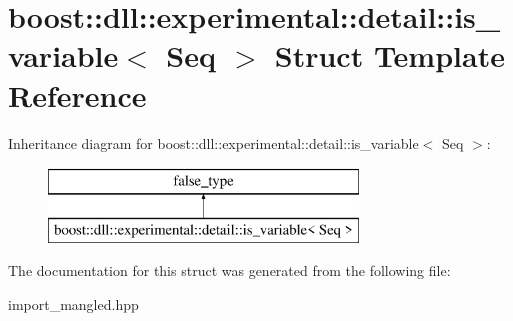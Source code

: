 \hypertarget{a01680}{}\section{boost\+:\+:dll\+:\+:experimental\+:\+:detail\+:\+:is\+\_\+variable$<$ Seq $>$ Struct Template Reference}
\label{a01680}
Inheritance diagram for boost\+:\+:dll\+:\+:experimental\+:\+:detail\+:\+:is\+\_\+variable$<$ Seq $>$\+:\begin{figure}[H]
\begin{center}
\leavevmode
\includegraphics[height=2.000000cm]{a01680}
\end{center}
\end{figure}


The documentation for this struct was generated from the following file\+:\begin{DoxyCompactItemize}
\item 
import\+\_\+mangled.\+hpp\end{DoxyCompactItemize}

